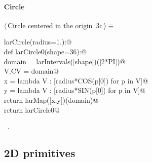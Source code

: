 \documentclass[11pt,oneside]{article}	%
\begin{document}
\paragraph{Circle}
\begin{flushleft} \small \label{scrap6}
\protect{}$\langle\,$Circle centered in the origin\nobreak\ {\footnotesize 3c}$\,\rangle\equiv$
\vspace{-1ex}
\begin{list}{}{} \item
\mbox{}\verb@def larCircle(radius=1.):@\\
\mbox{}\verb@   def larCircle0(shape=36):@\\
\mbox{}\verb@      domain = larIntervals([shape])([2*PI])@\\
\mbox{}\verb@      V,CV = domain@\\
\mbox{}\verb@      x = lambda V : [radius*COS(p[0]) for p in V]@\\
\mbox{}\verb@      y = lambda V : [radius*SIN(p[0]) for p in V]@\\
\mbox{}\verb@      return larMap([x,y])(domain)@\\
\mbox{}\verb@   return larCircle0@\\
\mbox{}\verb@@{\NWsep}
\end{list}
\vspace{-1ex}
\footnotesize\addtolength{\baselineskip}{-1ex}
\begin{list}{}{\setlength{\itemsep}{-\parsep}\setlength{\itemindent}{-\leftmargin}}
\item \NWtxtMacroRefIn\ .
\end{list}
\end{flushleft}
\subsection{2D primitives}
\end{document}
